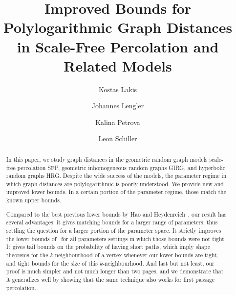 \documentclass[11pt, letterpaper, margin=1in]{amsart}
\author[Kostas Lakis]{Kostas Lakis}
\author[Johannes Lengler]{Johannes Lengler}
\author[Kalina Petrova]{Kalina Petrova}
\author[Leon Schiller]{Leon Schiller}
\title[Improved Bounds for Polylogarithmic Graph Distances in Scale-Free Percolation]{Improved Bounds for Polylogarithmic Graph Distances in Scale-Free Percolation and Related Models}
\theoremstyle{definition}
\theoremstyle{remark}
\numberwithin{equation}{section}
\begin{document}
\newcommand{\ultratinypentagram}{
    \begin{tikzpicture}[baseline=-0.8ex]
        \node[regular polygon, regular polygon sides=5, minimum size=2mm, draw, inner sep=0pt, outer sep=0pt, line width=0.05mm] at (0,0) (pentagon) {};
        \foreach \x in {1,2,...,5} {
            \foreach \y in {\x,...,5} {
                \ifnum\x=\y\relax\else
                    \draw[line width=0.05mm] (pentagon.corner \x) -- (pentagon.corner \y);
                \fi
            }
        }
    \end{tikzpicture}
}\textit{}

\newcommand{\tinyKfour}{
    \begin{tikzpicture}[baseline=-0.8ex]
        \node[regular polygon, regular polygon sides=4, minimum size=2mm, draw, inner sep=0pt, outer sep=0pt, line width=0.05mm] at (0,0) (quad) {};
        \foreach \x in {1,2,...,4} {
            \foreach \y in {\x,...,4} {
                \ifnum\x=\y\relax\else
                    \draw[line width=0.05mm] (quad.corner \x) -- (quad.corner \y);
                \fi
            }
        }
    \end{tikzpicture}
}
\newcommand{\CFFPP}{CFFP\xspace}


\begin{abstract}
In this paper, we study graph distances in the geometric random graph models scale-free percolation SFP, geometric inhomogeneous random graphs GIRG, and hyperbolic random graphs HRG. 
Despite the wide success of the models, the parameter regime in which graph distances are polylogarithmic is poorly understood. We provide new and improved lower bounds. In a certain portion of the parameter regime, those match the known upper bounds.

Compared to the best previous lower bounds by Hao and Heydenreich~\cite{hao2023graph}, our result has several advantages: it gives matching bounds for a larger range of parameters, thus settling the question for a larger portion of the parameter space. It strictly improves the lower bounds of~\cite{hao2023graph} for all parameters settings in which those bounds were not tight. It gives tail bounds on the probability of having short paths, which imply shape theorems for the $k$-neighbourhood of a vertex whenever our lower bounds are tight, and tight bounds for the size of this $k$-neighbourhood. And last but not least, our proof is much simpler and not much longer than two pages, and we demonstrate that it generalizes well by showing that the same technique also works for first passage percolation.
\end{abstract}
\maketitle
\thispagestyle{empty}
\clearpage
\setcounter{page}{1}
\end{document}
